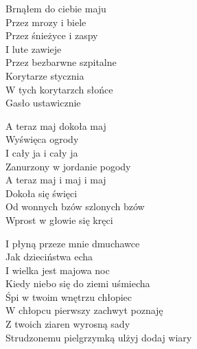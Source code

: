 \begin{text}
    Brnąłem do ciebie maju\\
    Przez mrozy i biele\\
    Przez śnieżyce i zaspy\\
    I lute zawieje\\
    Przez bezbarwne szpitalne\\
    Korytarze stycznia\\
    W tych korytarzch słońce\\
    Gasło ustawicznie

    \vin A teraz maj dokoła maj\\
    \vin Wyświęca ogrody\\
    \vin I cały ja i cały ja\\
    \vin Zanurzony w jordanie pogody\\
    \vin A teraz maj i maj i maj\\
    \vin Dokoła się święci\\
    \vin Od wonnych bzów szlonych bzów\\
    \vin Wprost w głowie się kręci

    I płyną przeze mnie dmuchawce\\
    Jak dzieciństwa echa\\
    I wielka jest majowa noc\\
    Kiedy niebo się do ziemi uśmiecha\\
    Śpi w twoim wnętrzu chłopiec\\
    W chłopcu pierwszy zachwyt poznaję\\
    Z twoich ziaren wyrosną sady\\
    Strudzonemu pielgrzymką ulżyj dodaj wiary
\end{text}
\begin{chord}

\end{chord}